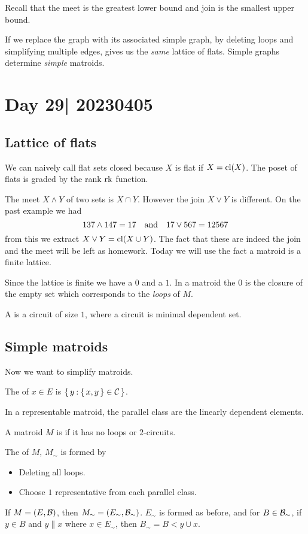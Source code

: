 \documentclass[12pt]{memoir}
\begin{document}
Recall that the meet is the greatest lower bound and join is the smallest upper bound.\par 
If we replace the graph with its associated simple graph, by deleting loops and simplifying multiple edges, gives us the \emph{same} lattice of flats. Simple graphs determine \emph{simple} matroids. 

\section{Day 29| 20230405}

\subsection{Lattice of flats}

We can naively call flat sets closed because $X$ is flat if $X=\operatorname{cl}(X)$. The poset of flats is graded by the rank $\operatorname{rk}$ function.\par 
The meet $X\land Y$ of two sets is $X\cap Y$. However the join $X\lor Y$ is different. On the past example we had
$$137\land 147= 17\quad\text{and}\quad17\lor567=12567$$
from this we extract $X\lor Y=\operatorname{cl}(X\cup Y)$. The fact that these are indeed the join and the meet will be left as homework. Today we will use the fact a matroid is a finite lattice.\par 
Since the lattice is finite we have a $0$ and a $1$. In a matroid the $0$ is the closure of the empty set which corresponds to the \emph{loops} of $M$.

\begin{Def}
    A  is a circuit of size $1$, where a circuit is minimal dependent set.
\end{Def}

\subsection{Simple matroids}

Now we want to simplify matroids.

\begin{Def}
    The  of $x\in E$ is $\{\,y\mathbin{:} \{\,x,y\,\}\in\mathcal{C}\,\}$.
\end{Def}

In a representable matroid, the parallel class are the linearly dependent elements.

\begin{Def}
    A matroid $M$ is  if it has no loops or $2$-circuits.\par 
    The  of $M$, $M_\sim$ is formed by
    \begin{itemize}
        \item Deleting all loops.
        \item Choose $1$ representative from each parallel class.
    \end{itemize}
If $M=(E,\mathcal{B})$, then $M_\sim=(E_\sim,\mathcal{B}_\sim)$. $E_\sim$ is formed as before, and for $B\in\mathcal{B}_\sim$, if $y\in B$ and $y\parallel x$ where $x\in E_\sim$, then $B_\sim=B\less y\cup x$.
\end{Def}
\end{document}
